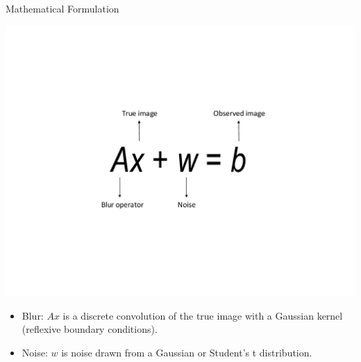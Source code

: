 \documentclass[12pt]{beamer}
\begin{document}
\begin{frame}{Mathematical Formulation}
\begin{center}
\vspace{-3ex}
\includegraphics[scale=0.5]{../figures/linearModel}
\end{center}

\vspace{-3ex}
\begin{itemize}
\item Blur: $Ax$ is a discrete convolution of the true image with a Gaussian kernel (reflexive boundary conditions).
\item Noise: $w$ is noise drawn from a Gaussian or Student's t distribution. 
\end{itemize}
\end{frame}
\end{document}
